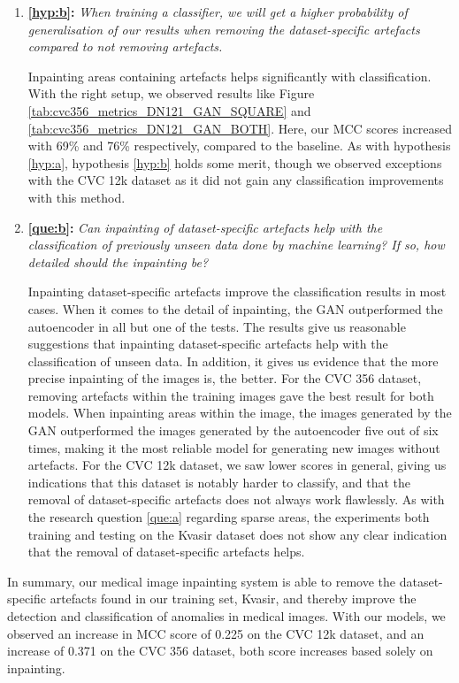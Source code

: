 \begin{enumerate}
\item \textbf{\ref{hyp:b}:} \textit{When training a classifier, we will get a higher probability of generalisation of our results when removing the dataset-specific artefacts compared to not removing artefacts.}
    
Inpainting areas containing artefacts helps significantly with classification. With the right setup, we observed results like Figure \ref{tab:cvc356_metrics_DN121_GAN_SQUARE} and \ref{tab:cvc356_metrics_DN121_GAN_BOTH}. Here, our MCC scores increased with 69\% and 76\% respectively, compared to the baseline.
As with hypothesis \ref{hyp:a}, hypothesis \ref{hyp:b} holds some merit, though we observed exceptions with the CVC 12k dataset as it did not gain any classification improvements with this method.


\item \textbf{\ref{que:b}:} \textit{ Can inpainting of dataset-specific artefacts help with the classification of previously unseen data done by machine learning? If so, how detailed should the inpainting be?}
    
    
Inpainting dataset-specific artefacts improve the classification results in most cases. When it comes to the detail of inpainting, the GAN outperformed the autoencoder in all but one of the tests. The results give us reasonable suggestions that inpainting dataset-specific artefacts help with the classification of unseen data. In addition, it gives us evidence that the more precise inpainting of the images is, the better.
For the CVC 356 dataset, removing artefacts within the training images gave the best result for both models. When inpainting areas within the image, the images generated by the GAN outperformed the images generated by the autoencoder five out of six times, making it the most reliable model for generating new images without artefacts. 
For the CVC 12k dataset, we saw lower scores in general, giving us indications that this dataset is notably harder to classify, and that the removal of dataset-specific artefacts does not always work flawlessly. 
As with the research question \ref{que:a} regarding sparse areas, the experiments both training and testing on the Kvasir dataset does not show any clear indication that the removal of dataset-specific artefacts helps.

\end{enumerate}

\noindent
In summary, our medical image inpainting system is able to remove the dataset-specific artefacts found in our training set, Kvasir, and thereby improve the detection and classification of anomalies in medical images.
With our models, we observed an increase in MCC score of 0.225 on the CVC 12k dataset, and an increase of 0.371 on the CVC 356 dataset, both score increases based solely on inpainting.

